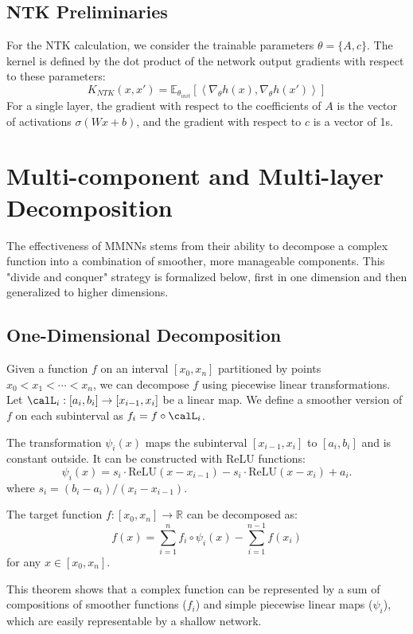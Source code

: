 \documentclass{article}
\begin{document}
\subsection{NTK Preliminaries}
For the NTK calculation, we consider the trainable parameters $\theta = \{A, c\}$. The kernel is defined by the dot product of the network output gradients with respect to these parameters:
\begin{equation}
    K_{NTK}(x, x') = \mathbb{E}_{\theta_{init}} \left[ \left\langle \nabla_{\theta} h(x), \nabla_{\theta} h(x') \right\rangle \right]
\end{equation}
For a single layer, the gradient with respect to the coefficients of $A$ is the vector of activations $\sigma(Wx+b)$, and the gradient with respect to $c$ is a vector of 1s.

\section{Multi-component and Multi-layer Decomposition}
The effectiveness of MMNNs stems from their ability to decompose a complex function into a combination of smoother, more manageable components. This "divide and conquer" strategy is formalized below, first in one dimension and then generalized to higher dimensions.

\subsection{One-Dimensional Decomposition}
Given a function $f$ on an interval $[x_0, x_n]$ partitioned by points $x_0 < x_1 < \cdots < x_n$, we can decompose $f$ using piecewise linear transformations. Let $\calL_i:[a_i,b_i]\to [x_{i-1},x_i]$ be a linear map. We define a smoother version of $f$ on each subinterval as $f_i = f \circ \calL_i$.

The transformation $\psi_i(x)$ maps the subinterval $[x_{i-1}, x_i]$ to $[a_i, b_i]$ and is constant outside. It can be constructed with ReLU functions:
\begin{equation}
    \psi_i(x)=s_i\cdot \text{ReLU}\left( {x-x_{i-1}} \right)
    -s_i\cdot \text{ReLU}\left( {x-x_{i}} \right)+a_i.
\end{equation}
where $s_i = (b_i-a_i)/(x_i-x_{i-1})$.

\begin{theorem}[1D Decomposition]
The target function $f:[x_0,x_n]\to\mathbb{R}$ can be decomposed as:
\begin{equation}
    f(x) = \sum_{i=1}^n f_i\circ \psi_i(x) - \sum_{i=1}^{n-1}f(x_i)
\end{equation}
for any $x \in [x_0, x_n]$.
\end{theorem}
This theorem shows that a complex function can be represented by a sum of compositions of smoother functions ($f_i$) and simple piecewise linear maps ($\psi_i$), which are easily representable by a shallow network.
\end{document}
